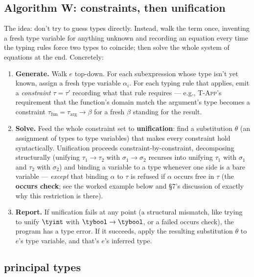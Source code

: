 \subsection{Algorithm W: constraints, then unification}

The idea: don't try to guess types directly. Instead, walk the term once, inventing a fresh type variable for anything unknown and recording an equation every time the typing rules force two types to coincide; then solve the whole system of equations at the end. Concretely:

\begin{enumerate}
  \item \textbf{Generate.} Walk $e$ top-down. For each subexpression whose type isn't yet known, assign a fresh type variable $\alpha_i$. For each typing rule that applies, emit a \emph{constraint} $\tau = \tau'$ recording what that rule requires — e.g., \textsc{T-App}'s requirement that the function's domain match the argument's type becomes a constraint $\tau_{\mathrm{fun}} = \tau_{\mathrm{arg}} \to \beta$ for a fresh $\beta$ standing for the result.
  \item \textbf{Solve.} Feed the whole constraint set to \textbf{unification}: find a substitution $\theta$ (an assignment of types to type variables) that makes every constraint hold syntactically. Unification proceeds constraint-by-constraint, decomposing structurally (unifying $\tau_1\to\tau_2$ with $\sigma_1\to\sigma_2$ recurses into unifying $\tau_1$ with $\sigma_1$ and $\tau_2$ with $\sigma_2$) and binding a variable to a type whenever one side is a bare variable — \emph{except} that binding $\alpha$ to $\tau$ is refused if $\alpha$ occurs free in $\tau$ (the \textbf{occurs check}; see the worked example below and \S7's discussion of exactly why this restriction is there).
  \item \textbf{Report.} If unification fails at any point (a structural mismatch, like trying to unify $\tyint$ with $\tybool\to\tybool$, or a failed occurs check), the program has a type error. If it succeeds, apply the resulting substitution $\theta$ to $e$'s type variable, and that's $e$'s inferred type.
\end{enumerate}

\subsection{principal types}

